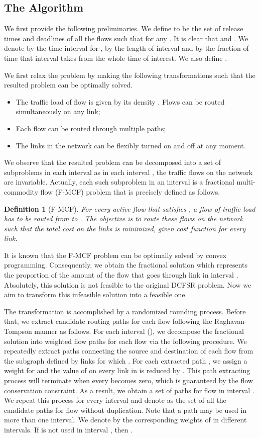 \documentclass[10pt, conference, compsocconf]{IEEEtran}
\newtheorem{definition}{Definition}
\begin{document}
\subsection{The Algorithm}

We first provide the following preliminaries. We define  to be the set of release times and deadlines of all the flows such that  for any . It is clear that  and . We denote by  the time interval  for , by  the length of interval  and by  the fraction of time that interval  takes from the whole time of interest. We also define .

We first relax the problem by making the following transformations such that the resulted problem can be optimally solved.
\begin{itemize}
\item The traffic load of flow  is given by its density . Flows can be routed simultaneously on any link;
\item Each flow can be routed through multiple paths;
\item The links in the network can be flexibly turned on and off at any moment.
\end{itemize}
We observe that the resulted problem can be decomposed into a set of subproblems in each interval  as in each interval , the traffic flows on the network are invariable. Actually, each such subproblem in an interval is a fractional multi-commodity flow (F-MCF) problem that is precisely defined as follows.
\begin{definition}[F-MCF]
For every active flow  that satisfies , a flow of traffic load  has to be routed from  to . The objective is to route these flows on the network such that the total cost on the links is minimized, given cost function  for every link.
\end{definition}

It is known that the F-MCF problem can be optimally solved by convex programming. Consequently, we obtain the fractional solution  which represents the proportion of the amount of the flow  that goes through link  in interval . Absolutely, this solution is not feasible to the original DCFSR problem. Now we aim to transform this infeasible solution into a feasible one.

The transformation is accomplished by a randomized rounding process. Before that, we extract candidate routing paths for each flow following the Raghavan-Tompson \cite{Raghavan_Tompson} manner as follows. For each interval  (), we decompose the fractional solution  into weighted flow paths for each flow  via the following procedure. We repeatedly extract paths connecting the source and destination of each flow  from the subgraph defined by links  for which . For each extracted path , we assign a weight  for  and the value of  on every link in  is reduced by . This path extracting process will terminate when every  becomes zero, which is guaranteed by the flow conservation constraint. As a result, we obtain a set  of paths for flow  in interval . We repeat this process for every interval and denote  as the set of all the candidate paths for flow  without duplication. Note that a path  may be used in more than one interval. We denote by  the corresponding weights of  in different intervals. If  is not used in interval , then .
\end{document}
